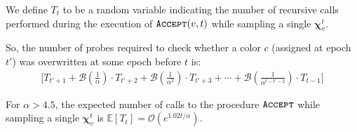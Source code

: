 \begin{definition}
\label{def:coloring_probes}
We define $T_t$ to be a random variable indicating the number of recursive calls performed during the execution of $\texttt{\textsc{Accept}}(v,t)$
while sampling a single $\bm \chi_v^t$.
\end{definition}
So, the number of probes required to check whether a color $c$ (assigned at epoch $t'$) was overwritten at some epoch before $t$ is:
\begin{align}
\label{eq:color_overwrite}
\Biggl[T_{t'+1} + \mathcal B\left(\frac{1}{\alpha}\right)\cdot T_{t'+2}
+ \mathcal B\left(\frac{1}{\alpha^2}\right)\cdot T_{t'+3} + \cdots
+ \mathcal B\left(\frac{1}{\alpha^{t-t'-2}}\right)\cdot T_{t-1} \Biggr]
\end{align}

\begin{lemma}
\label{lem:coloring_recurrence}
For $\alpha > 4.5$, the expected number of calls to the procedure $\texttt{\textsc{Accept}}$ while sampling a single $\bm\chi^t_v$
is $\mathbb E[T_t] = \mathcal{O}\left(e^{1.02t/\alpha}\right)$.
\end{lemma}
